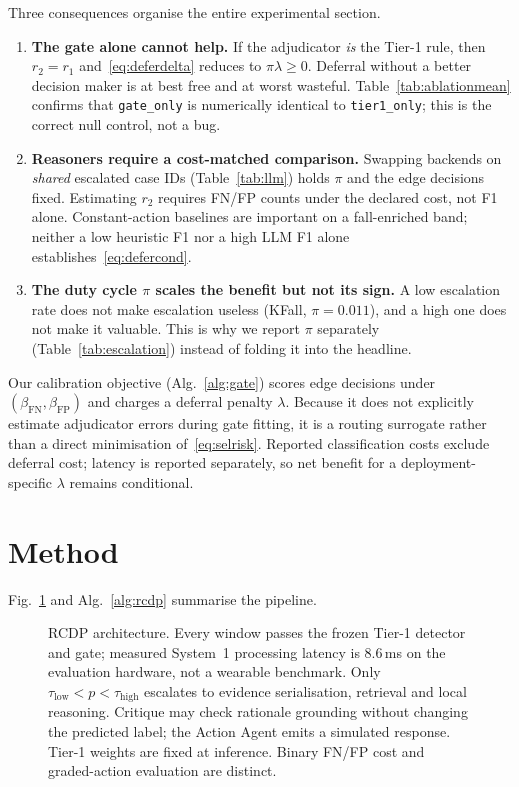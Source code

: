 \documentclass[journal]{IEEEtran}
\begin{document}
Three consequences organise the entire experimental section.

\begin{enumerate}
\item \textbf{The gate alone cannot help.} If the adjudicator \emph{is} the Tier-1 rule, then $r_2=r_1$ and~\eqref{eq:deferdelta} reduces to $\pi\lambda\ge 0$. Deferral without a better decision maker is at best free and at worst wasteful. Table~\ref{tab:ablationmean} confirms that \texttt{gate\_only} is numerically identical to \texttt{tier1\_only}; this is the correct null control, not a bug.
\item \textbf{Reasoners require a cost-matched comparison.} Swapping backends on \emph{shared} escalated case IDs (Table~\ref{tab:llm}) holds $\pi$ and the edge decisions fixed. Estimating $r_2$ requires FN/FP counts under the declared cost, not F1 alone. Constant-action baselines are important on a fall-enriched band; neither a low heuristic F1 nor a high LLM F1 alone establishes~\eqref{eq:defercond}.
\item \textbf{The duty cycle $\pi$ scales the benefit but not its sign.} A low escalation rate does not make escalation useless (KFall, $\pi{=}0.011$), and a high one does not make it valuable. This is why we report $\pi$ separately (Table~\ref{tab:escalation}) instead of folding it into the headline.
\end{enumerate}

Our calibration objective (Alg.~\ref{alg:gate}) scores edge decisions under $(\beta_{\mathrm{FN}},\beta_{\mathrm{FP}})$ and charges a deferral penalty $\lambda$. Because it does not explicitly estimate adjudicator errors during gate fitting, it is a routing surrogate rather than a direct minimisation of~\eqref{eq:selrisk}. Reported classification costs exclude deferral cost; latency is reported separately, so net benefit for a deployment-specific $\lambda$ remains conditional.

\section{Method}
\label{sec:method}

Fig.~\ref{fig:arch} and Alg.~\ref{alg:rcdp} summarise the pipeline.

\begin{figure}[!t]
\centering
\resizebox{\linewidth}{!}{}
\caption{RCDP architecture. Every window passes the frozen Tier-1 detector and gate; measured System~1 processing latency is $8.6$\,ms on the evaluation hardware, not a wearable benchmark. Only $\tau_{\mathrm{low}}<p<\tau_{\mathrm{high}}$ escalates to evidence serialisation, retrieval and local reasoning. Critique may check rationale grounding without changing the predicted label; the Action Agent emits a simulated response. Tier-1 weights are fixed at inference. Binary FN/FP cost and graded-action evaluation are distinct.}
\label{fig:arch}
\end{figure}
\end{document}
